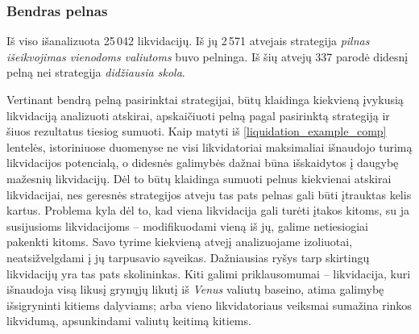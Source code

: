 \documentclass[]{VUMIFTemplateClass}
\begin{document}


\subsubsection{Bendras pelnas}
\label{sec:drain_bendras_pelnas}

Iš viso išanalizuota 25\,042 likvidacijų. Iš jų 2\,571 atvejais strategija \textit{pilnas išeikvojimas vienodoms valiutoms} buvo pelninga. Iš šių atvejų 337 parodė didesnį pelną nei strategija \textit{didžiausia skola}.

Vertinant bendrą pelną pasirinktai strategijai, būtų klaidinga kiekvieną įvykusią likvidaciją analizuoti atskirai, apskaičiuoti pelną pagal pasirinktą strategiją ir šiuos rezultatus tiesiog sumuoti. Kaip matyti iš \ref{liquidation_example_comp} lentelės, istoriniuose duomenyse ne visi likvidatoriai maksimaliai išnaudojo turimą likvidacijos potencialą, o didesnės galimybės dažnai būna išskaidytos į daugybę mažesnių likvidacijų. Dėl to būtų klaidinga sumuoti pelnus kiekvienai atskirai likvidacijai, nes geresnės strategijos atveju tas pats pelnas gali būti įtrauktas kelis kartus. Problema kyla dėl to, kad viena likvidacija gali turėti įtakos kitoms, su ja susijusioms likvidacijoms – modifikuodami vieną iš jų, galime netiesiogiai pakenkti kitoms. Savo tyrime kiekvieną atvejį analizuojame izoliuotai, neatsižvelgdami į jų tarpusavio sąveikas. Dažniausias ryšys tarp skirtingų likvidacijų yra tas pats skolininkas. Kiti galimi priklausomumai – likvidacija, kuri išnaudoja visą likusį grynųjų likutį iš \textit{Venus} valiutų baseino, atima galimybę išsigryninti kitiems dalyviams; arba vieno likvidatoriaus veiksmai sumažina rinkos likvidumą, apsunkindami valiutų keitimą kitiems.
\end{document}
